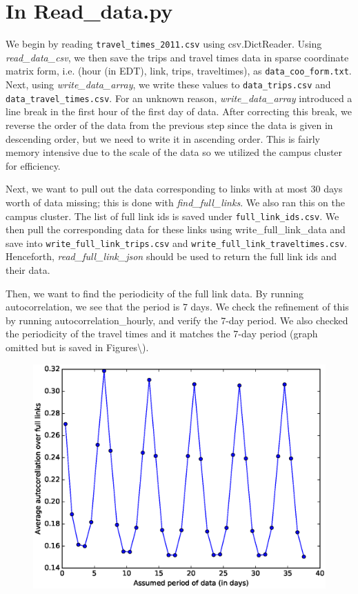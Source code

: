 \documentclass[12pt]{article}
\begin{document}
\section{In Read\_data.py}
We begin by reading \texttt{travel\_times\_2011.csv} using csv.DictReader. 
Using \\\textsl{read\_data\_csv}, we then save the trips and travel times data in sparse coordinate matrix form, i.e. (hour (in EDT), link, trips, traveltimes), as \texttt{data\_coo\_form.txt}. 
Next, using \textsl{write\_data\_array},  we write these values to \texttt{data\_trips.csv} and \texttt{data\_travel\_times.csv}. 
For an unknown reason, \textsl{write\_data\_array} introduced a line break in the first hour of the first day of data.
After correcting this break, we reverse the order of the data from the previous step since the data is given in descending order, but we need to write it in ascending order.
This is fairly memory intensive due to the scale of the data so we utilized the campus cluster for efficiency. 

Next, we want to pull out the data corresponding to links with at most 30 days worth of data missing; this is done with \textsl{find\_full\_links}. 
We also ran this on the campus cluster.
The list of full link ids is saved under \texttt{full\_link\_ids.csv}.
We then pull the corresponding data for these links using write\_full\_link\_data and save into \texttt{write\_full\_link\_trips.csv} and \texttt{write\_full\_link\_traveltimes.csv}.
Henceforth, \textsl{read\_full\_link\_json} should be used to return the full link ids and their data.

Then, we want to find the periodicity of the full link data. 
By running autocorrelation, we see that the period is 7 days. 
We check the refinement of this by running autocorrelation\_hourly, and verify the 7-day period.
We also checked the periodicity of the travel times and it matches the 7-day period (graph omitted but is saved in Figures\textbackslash).

\begin{figure}[H]
\centering
\includegraphics[width=.9\textwidth]{Autocorrelation_Full_Links.ps}
\end{figure}
\end{document}
